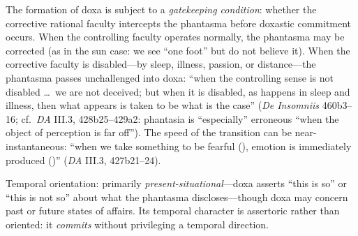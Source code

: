 \begin{itemize}
\begin{itemize}
\begin{itemize}
\begin{enumerate}
                  The formation of doxa is subject to a \textit{gatekeeping
                  condition}: whether the corrective rational faculty intercepts the
                  phantasma before doxastic commitment occurs. When the controlling
                  faculty operates normally, the phantasma may be corrected (as in
                  the sun case: we see ``one foot'' but do not believe it). When the
                  corrective faculty is disabled---by sleep, illness, passion, or
                  distance---the phantasma passes unchallenged into doxa: ``when the
                  controlling sense is not disabled \ldots\ we are not deceived; but
                  when it is disabled, as happens in sleep and illness, then what
                  appears is taken to be what is the case'' (\textit{De Insomniis}
                  460b3--16; cf.\ \textit{DA} III.3, 428b25--429a2: phantasia is
                  ``especially'' erroneous ``when the object of perception is far
                  off''). The speed of the transition can be near-instantaneous:
                  ``when we take something to be fearful (),
                  emotion is immediately produced ()''
                  (\textit{DA} III.3, 427b21--24).

                  Temporal orientation: primarily \textit{present-situational}---doxa
                  asserts ``this is so'' or ``this is not so'' about what the
                  phantasma discloses---though doxa may concern past or future states
                  of affairs. Its temporal character is assertoric rather than
                  oriented: it \textit{commits} without privileging a temporal
                  direction.



\end{enumerate}
\end{itemize}
\end{itemize}
\end{itemize}
